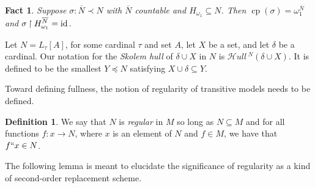 \documentclass{amsart}
\newtheorem{fact}[theorem]{Fact}
\theoremstyle{definition}
\newtheorem{definition}[theorem]{Definition}
\theoremstyle{remark}
\newtheorem{remark}[theorem]{Remark}
\newcommand{\N}{{\overline{N}}}
\newcommand{\ZFC}{\textup{\ensuremath{\textsf{ZFC}}}}
\newcommand{\id}{\textup{\ensuremath{\text{id}}}}
\DeclareMathOperator{\cp}{cp}
\newcommand{\To}{\longrightarrow}
\newcommand{\rest}{\mathbin{\upharpoonright}}
\newcommand{\SH}{\mathcal{H}\textit{ull} \,}
\newcommand{\Sk}[3]{\SH^{#1}( {#2} \cup {#3} ) }
\begin{document}
\begin{fact} \label{fact:CPofourEmbeddings} Suppose $\sigma: \N \prec N$ with $\N$ countable and $H_{\omega_1} \subseteq N$. Then $\cp(\sigma)=\omega_1^{\N}$ and $\sigma \rest H_{\omega_1}^{\N} = \id$. \end{fact}

Let $N = L_\tau[A]$, for some cardinal $\tau$ and set $A$, let $X$ be a set, and let $\delta$ be a cardinal. Our notation for the \emph{Skolem hull} of $\delta \cup X$ in $N$ is $\Sk{N}{\delta}{X}$. It is defined to be the smallest $Y \preccurlyeq N$ satisfying $X \cup \delta \subseteq Y$.
	
%
%

Toward defining fullness, the notion of regularity of transitive models needs to be defined.

\begin{definition} We say that $N$ is \emph{regular} in $M$ so long as $N \subseteq M$ and for all functions $f: x \To N$, where $x$ is an element of $N$ and $f \in M$, we have that $f``x \in N$. \end{definition}
The following lemma is meant to elucidate the significance of regularity as a kind of second-order
replacement scheme.
\end{document}
